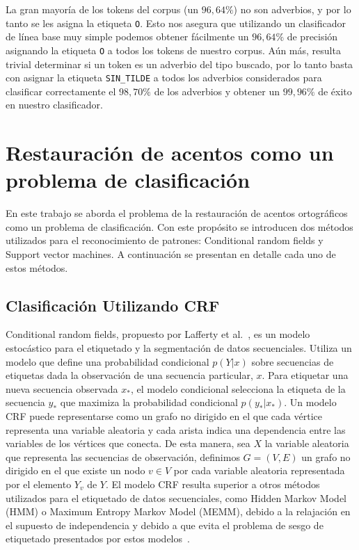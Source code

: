 \documentclass[runningheads,a4paper]{llncs}
\begin{document}
La gran mayoría de los tokens del corpus (un $96,64\%$)  no son adverbios, y por lo tanto se les asigna la etiqueta \texttt{\small O}. Esto nos asegura que utilizando un clasificador de línea base muy simple podemos obtener fácilmente un $96,64\%$ de precisión asignando la etiqueta \texttt{\small O} a todos los tokens de nuestro corpus. A\'un m\'as, resulta trivial determinar si un token es un adverbio del tipo buscado, por lo tanto basta con asignar la etiqueta \texttt{\small SIN\_TILDE} a todos los adverbios considerados para clasificar correctamente el $98,70\%$ de los adverbios y obtener un $99,96\%$ de \'exito en nuestro clasificador.

\section{Restauración de acentos como un problema de clasificación}
\label{sec:solucion-propuesta}

En este trabajo se aborda el problema de la restauraci\'on de acentos ortogr\'aficos como un problema de clasificaci\'on. Con este propósito se introducen dos m\'etodos utilizados para el reconocimiento de patrones: Conditional random fields y Support vector machines. A continuación se presentan en detalle cada uno de estos métodos.

\subsection{Clasificación Utilizando CRF}
\label{sec:CRF}

Conditional random fields, propuesto por Lafferty et al.~\cite{LAFFERTY01}, es un modelo estocástico para el etiquetado y la segmentación de datos secuenciales. Utiliza un modelo que define una probabilidad condicional $p(Y|x)$ sobre secuencias de etiquetas dada la observación de una secuencia particular, $x$. Para etiquetar una nueva secuencia observada $x_*$, el modelo condicional selecciona la etiqueta de la secuencia $y_*$ que maximiza la probabilidad condicional $p(y_*|x_*)$. Un modelo CRF puede representarse como un grafo no dirigido en el que cada vértice representa una variable aleatoria y cada arista indica una dependencia entre las variables de los vértices que conecta. De esta manera, sea $X$ la variable aleatoria que representa las secuencias de observaci\'on, definimos $G=(V,E)$ un grafo no dirigido en el que existe un nodo $v \in V$ por cada variable aleatoria representada por el elemento $Y_v$ de $Y$. El modelo CRF resulta superior a otros métodos utilizados para el etiquetado de datos secuenciales, como Hidden Markov Model (HMM) o Maximum Entropy Markov Model (MEMM), debido a la relajación en el supuesto de independencia y debido a que evita el problema de sesgo de etiquetado presentados por estos modelos~\cite{WALLACH04}.
\end{document}
